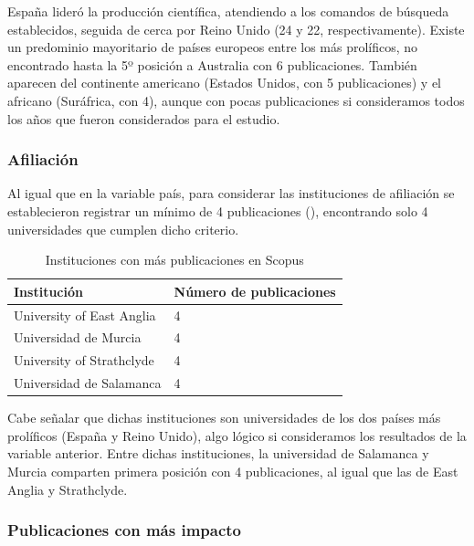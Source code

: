 \documentclass[spanish]{textolivre}
\begin{document}
España lideró la producción científica, atendiendo a los comandos de búsqueda establecidos, seguida de cerca por Reino Unido (24 y 22, respectivamente). Existe un predominio mayoritario de países europeos entre los más prolíficos, no encontrado hasta la 5º posición a Australia con 6 publicaciones. También aparecen del continente americano (Estados Unidos, con 5 publicaciones) y el africano (Suráfrica, con 4), aunque con pocas publicaciones si consideramos todos los años que fueron considerados para el estudio.


\subsubsection{Afiliación}

Al igual que en la variable país, para considerar las instituciones de afiliación se establecieron registrar un mínimo de 4 publicaciones (), encontrando solo 4 universidades que cumplen dicho criterio.

\begin{table}[h!]
\centering
\begin{threeparttable}
\caption{Instituciones con más publicaciones en Scopus}
\label{tab5}
\begin{tabular}{ll}
\toprule
Institución      & Número de publicaciones \\
\midrule
University of East Anglia & 4                                \\
Universidad de Murcia     & 4                                \\
University of Strathclyde & 4                                \\
Universidad de Salamanca  & 4                                \\
\bottomrule
\end{tabular}
\end{threeparttable}
\end{table}

Cabe señalar que dichas instituciones son universidades de los dos países más prolíficos (España y Reino Unido), algo lógico si consideramos los resultados de la variable anterior. Entre dichas instituciones, la universidad de Salamanca y Murcia comparten primera posición con 4 publicaciones, al igual que las de East Anglia y Strathclyde.


\subsubsection{Publicaciones con más impacto}
\end{document}
